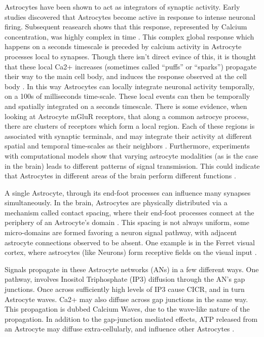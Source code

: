     Astrocytes have been shown to act as integrators of synaptic activity. Early
    studies discovered that Astrocytes become active in response to intense
    neuronal firing. Subsequent reasearch shows that this response, represented
    by Calcium concentration, was highly complex in time
    \cite{araque_2014}. This complex global response which happens on a seconds
    timescale is preceded by calcium activity in Astrocyte processes local to
    synapses. Though there isn't direct evince of this, it is thought that these
    local Ca2+ increases (sometimes called ``puffs'' or ``sparks'') propagate
    their way to the main cell body, and induces the response observed at the
    cell body \cite{araque_2014}. In this way Astrocytes can locally integrate
    neuronal activity temporally, on a 100s of milliseconds time-scale. These
    local events can then be temporally and spatially integrated on a seconds
    timescale. There is some evidence, when looking at Astrocyte mGluR
    receptors, that along a common astrocye process, there are clusters of
    receptors which form a local region. Each of these regions is associated
    with synaptic terminals, and may integrate their activity at different
    spatial and temporal time-scales as their neighbors
    \cite{pitta_2012}. Furthermore, experiments with computational models show
    that varying astrocyte modalities (as is the case in the brain) leads to
    different patterns of signal transmission. This could indicate that
    Astrocytes in different areas of the brain perform different functions
    \cite{pitta_2012}.

    A single Astrocyte, through its end-foot processes can influence many
    synapses simultaneously. In the brain, Astrocytes are physically distributed
    via a mechanism called contact spacing, where their end-foot processes
    connect at the periphery of an Astrocyte's domain \cite{pitta_2012}. This
    spacing is not always uniform, some micro-domains are formed favoring a
    neuron signal pathway, with adjacent astrocyte connections observed to be
    absent. One example is in the Ferret visual cortex, where astrocytes (like
    Neurons) form receptive fields on the visual input \cite{pitta_2012}.

    Signals propagate in these Astrocyte networks (ANs) in a few different
    ways. One pathway, involves Inositol Triphosphate (IP3) diffusion through
    the AN's gap junctions. Once across sufficiently high levels of IP3 cause
    CICR, and in turn Astrocyte waves. Ca2+ may also diffuse across gap
    junctions in the same way. This propagation is dubbed Calcium Waves, due to
    the wave-like nature of the propagation. In addition to the gap-junction
    mediated effects, ATP released from an Astrocyte may diffuse
    extra-cellularly, and influence other Astrocytes \cite{amiri_2013}.
    
